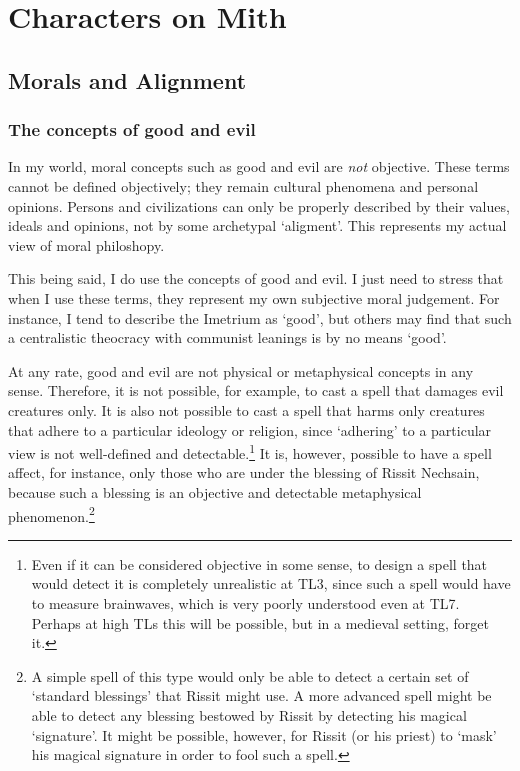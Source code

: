 \section{Characters on Mith}

\subsection{Morals and Alignment}

\subsubsection{The concepts of good and evil}
In my world, moral concepts such as good and evil are \emph{not} objective. These terms cannot be defined objectively; they remain cultural phenomena and personal opinions. Persons and civilizations can only be properly described by their values, ideals and opinions, not by some archetypal `aligment'. This represents my actual view of moral philoshopy. 


This being said, I do use the concepts of good and evil. I just need to stress that when I use these terms, they represent my own subjective moral judgement. For instance, I tend to describe the Imetrium as `good', but others may find that such a centralistic theocracy with communist leanings is by no means `good'. 

At any rate, good and evil are not physical or metaphysical concepts in any sense. Therefore, it is not possible, for example, to cast a spell that damages evil creatures only. It is also not possible to cast a spell that harms only creatures that adhere to a particular ideology or religion, since `adhering' to a particular view is not well-defined and detectable.\footnote{Even if it can be considered objective in some sense, to design a spell that would detect it is completely unrealistic at TL3, since such a spell would have to measure brainwaves, which is very poorly understood even at TL7. Perhaps at high TLs this will be possible, but in a medieval setting, forget it.}
It is, however, possible to have a spell affect, for instance, only those who are under the blessing of Rissit Nechsain, because such a blessing is an objective and detectable metaphysical phenomenon.\footnote{A simple spell of this type would only be able to detect a certain set of `standard blessings' that Rissit might use. A more advanced spell might be able to detect any blessing bestowed by Rissit by detecting his magical `signature'. It might be possible, however, for Rissit (or his priest) to `mask' his magical signature in order to fool such a spell.}

